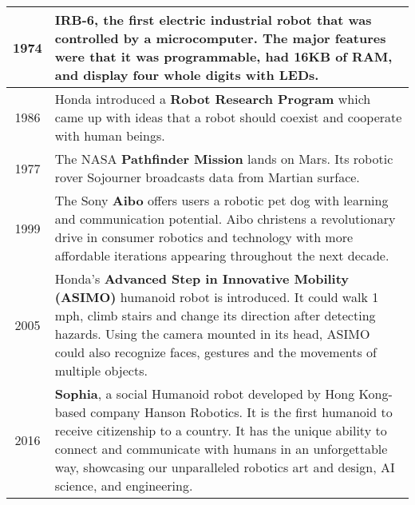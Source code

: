 \begin{table*}
\begin{tabular}{|c|p{14cm}|}
        \rowcolor[gray]{0.95} 1974 & \textbf{IRB-6}, the first electric industrial robot that was controlled by a microcomputer. The major features were that it was programmable, had 16KB of RAM, and display four whole digits with LEDs. \\ \hline
        
        1986 & Honda introduced a \textbf{Robot Research Program} which came up with ideas that a robot should coexist and cooperate with human beings. \\ \hline
        
        \rowcolor[gray]{0.95} 1977 & The NASA \textbf{Pathfinder Mission} lands on Mars. Its robotic rover Sojourner broadcasts data from Martian surface. \\ \hline
        
        1999 & The Sony \textbf{Aibo} offers users a robotic pet dog with learning and communication potential. Aibo christens a revolutionary drive in consumer robotics and technology with more affordable iterations appearing throughout the next decade. \\ \hline
        
        \rowcolor[gray]{0.95} 2005 &  Honda’s \textbf{Advanced Step in Innovative Mobility (ASIMO)} humanoid robot is introduced. It could walk 1 mph, climb stairs and change its direction after detecting hazards. Using the camera mounted in its head, ASIMO could also recognize faces, gestures and the movements of multiple objects. \\ \hline
        
        2016 & \textbf{Sophia}, a social Humanoid robot developed by Hong Kong-based company Hanson Robotics. It is the first humanoid to receive citizenship to a country. It has the unique ability to connect and communicate with humans in an unforgettable way, showcasing our unparalleled robotics art and design, AI science, and engineering.\\ \hline
        
    \end{tabular}
\end{table*}